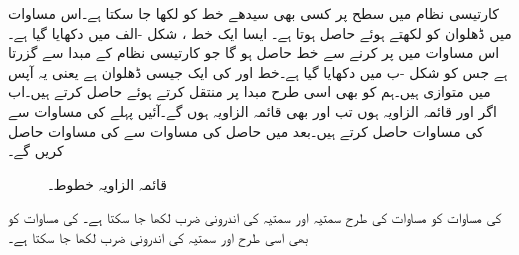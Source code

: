 کارتیسی نظام میں  سطح پر کسی بھی سیدھے خط کو  لکھا جا سکتا ہے۔اس مساوات میں ڈھلوان  کو    لکھتے ہوئے  حاصل ہوتا ہے۔ ایسا ایک خط ، شکل -الف میں دکھایا گیا ہے۔اس مساوات میں  پر کرنے سے خط  حاصل ہو گا جو کارتیسی نظام کے مبدا  سے گزرتا ہے جس کو شکل -ب میں  دکھایا گیا ہے۔خط  اور  کی ایک جیسی ڈھلوان ہے یعنی یہ آپس میں متوازی ہیں۔ہم   کو بھی اسی طرح مبدا پر منتقل کرتے ہوئے  حاصل کرتے ہیں۔اب اگر  اور  قائمہ الزاویہ ہوں تب  اور  بھی قائمہ الزاویہ ہوں گے۔آئیں پہلے  کی مساوات سے  کی مساوات حاصل کرتے ہیں۔بعد میں حاصل  کی مساوات سے  کی مساوات حاصل کریں گے۔ 
\begin{figure}
\centering
\begin{subfigure}{0.45\textwidth}
\centering
{}
\caption{}
\end{subfigure}\hfill
\begin{subfigure}{0.45\textwidth}
\centering
{}
\caption{}
\end{subfigure}
\caption{قائمہ الزاویہ خطوط۔}
\label{شکل_الجبرا_قائمہ_الزاویہ_خطوط}
\end{figure}

 کی مساوات   کو مساوات  کی طرح سمتیہ  اور سمتیہ  کی اندرونی ضرب   لکھا جا سکتا ہے۔ کی مساوات کو بھی اسی طرح  اور سمتیہ  کی اندرونی ضرب
   لکھا جا سکتا ہے۔

